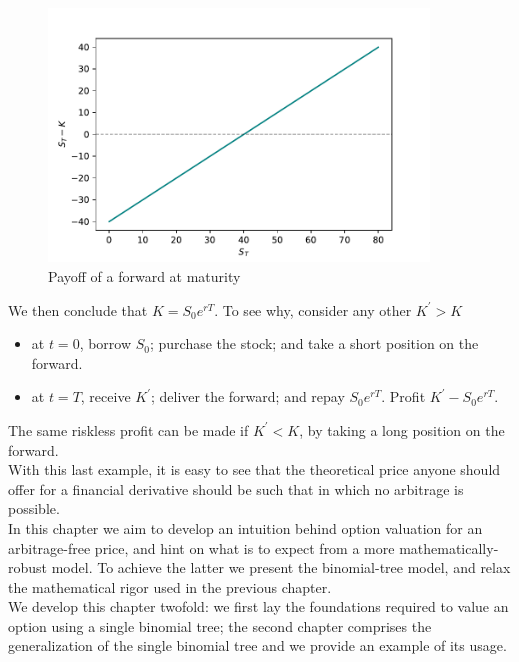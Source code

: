 \documentclass[../TGMAFFIRO.tex]{subfiles}
\begin{document}
\begin{figure}[hbt]
  \includegraphics[width=0.9\textwidth]{../images/foward_payoff}
  \caption{Payoff of a forward at maturity}
\end{figure}

We then conclude that $K=S_0e^{rT}$. To see why, consider any other $K^\prime > K$
\begin{itemize}
	\item at $t=0$, borrow $S_0$; purchase the stock; and take a short position on the forward.
	\item at $t=T$, receive $K^\prime$; deliver the forward; and repay $S_0e^{rT}$. Profit $K^\prime - S_0 e^{rT}$.
\end{itemize}

The same riskless profit can be made if $K^\prime < K$, by taking a long position on the forward.\\


With this last example, it is easy to see that the theoretical price anyone should offer for a financial derivative should be such that in which no arbitrage is possible.\\

 In this chapter we aim to develop an intuition behind option valuation for an arbitrage-free price, and hint on what is to expect from a more mathematically-robust model. To achieve the latter we present the binomial-tree model, and relax the mathematical rigor used in the previous chapter.\\

We develop this chapter twofold: we first lay the foundations required to value an option using a single binomial tree; the second chapter comprises the generalization of the single binomial tree and we provide an example of its usage.
\end{document}
